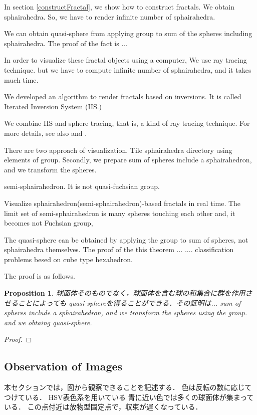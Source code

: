 \documentclass[dvipdfmx]{interact}
\theoremstyle{plain}%
\newtheorem{proposition}[theorem]{Proposition}
\theoremstyle{definition}
\theoremstyle{remark}
\theoremstyle{problemstyle}
\begin{document}
In section \ref{constructFractal}, we show how to construct fractals.
We obtain sphairahedra.
So, we have to render infinite number of sphairahedra.

We can obtain quasi-sphere from applying group to sum of the spheres
including sphairahedra.
The proof of the fact is ...

In order to visualize these fractal objects using a computer,
We use ray tracing technique. but we have to compute infinite number of
sphairahedra, and it takes much time.

We developed an algorithm to render fractals based on
inversions. It is called Iterated Inversion System (IIS.)

We combine IIS and sphere tracing, that is, a kind of ray tracing technique.
For more details, see also \cite{bridges2018} and \cite{bridges2017}.

There are two approach of visualization.
Tile sphairahedra directory using elements of group.
Secondly, we prepare sum of spheres include a sphairahedron, and we
transform the spheres.

semi-sphairahedron. It is not quasi-fuchsian group.

Visualize sphairahedron(semi-sphairahedron)-based fractals in real time.
The limit set of semi-sphairahedron is many spheres touching each other and,
it becomes not Fuchsian group,

The quasi-sphere can be obtained by applying the group to sum of
spheres, not sphairahedra themselves.
The proof of the this theorem ... ....
classification problems besed on cube type hexahedron.

The proof is as follows.

\begin{proposition}
球面体そのものでなく，球面体を含む球の和集合に群を作用させることによっても
quasi-sphereを得ることができる．その証明は...
sum of spheres include a sphairahedron, and we transform the spheres
 using the group. and we obtaing quasi-sphere.
\end{proposition}

\begin{proof}
\end{proof}

\subsection{Observation of Images}

本セクションでは，図から観察できることを記述する．
色は反転の数に応じてつけている．
HSV表色系を用いている
青に近い色では多くの球面体が集まっている．
この点付近は放物型固定点で，収束が遅くなっている．
\end{document}
